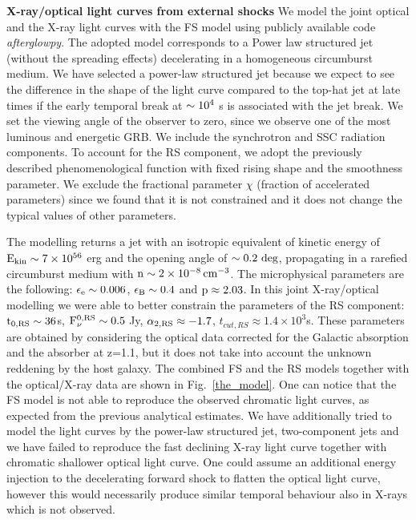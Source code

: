 \documentclass{naturesubmissionstyle}
\begin{document}
{\noindent \bf X-ray/optical light curves from external shocks}
We model the joint optical and the X-ray light curves with the FS model using publicly available code {\it afterglowpy}\cite{Ryan2020}. The adopted model corresponds to a Power law structured jet (without the spreading effects) decelerating in a homogeneous circumburst medium. We have selected a power-law structured jet because we expect to see the difference in the shape of the light curve compared to the top-hat jet at late times if the early temporal break at $\rm \sim 10^{4}$ s is associated with the jet break. We set the viewing angle of the observer to zero, since we observe one of the most luminous and energetic GRB. We include the synchrotron and SSC radiation components. To account for the RS component, we adopt the previously described phenomenological function with fixed rising shape and the smoothness parameter. We exclude the fractional parameter $\chi$ (fraction of accelerated parameters) since we found that it is not constrained and it does not change the typical values of other parameters. 

The modelling returns a jet with an isotropic equivalent of kinetic energy of $\rm E_{kin} \sim 7 \times 10^{56}$ erg and the opening angle of $\rm \sim 0.2\ deg$, propagating in a 
rarefied circumburst medium with $\rm n \sim 2 \times 10^{-8} \, cm^{-3}$. The microphysical parameters are the following: $\rm \epsilon_{e} \sim 0.006$, $\rm \epsilon_{B} \sim 0.4$ and $\rm p \approx 2.03$. In this joint X-ray/optical modelling we %
were able to better constrain  the parameters of the RS component: $\rm t_{0,RS} \sim 36$s, $\rm F_{\nu}^{0,RS} \sim 0.5$ Jy, $\rm \alpha_{2,RS} \approx -1.7$, $t_{cut,RS} \approx 1.4\times 10^{3}$s. These parameters are obtained by considering the optical data corrected for the Galactic absorption and the absorber at z=1.1, but it does not take into account the unknown reddening by the host galaxy. The combined FS and the RS models together with the optical/X-ray data are shown in Fig.~\ref{the_model}. One can notice that the FS model is not able to reproduce the observed chromatic light curves, as expected from the previous analytical estimates. We have additionally tried to model the light curves by the power-law structured jet, two-component jets and we have failed to reproduce the fast declining X-ray light curve together with chromatic shallower optical light curve. One could assume an additional energy injection to the decelerating forward shock\cite{Dai1998,Zhang2001} to flatten the optical light curve, however this would necessarily produce similar temporal behaviour also in X-rays\cite{Fan2006} which is not observed. 
\end{document}
